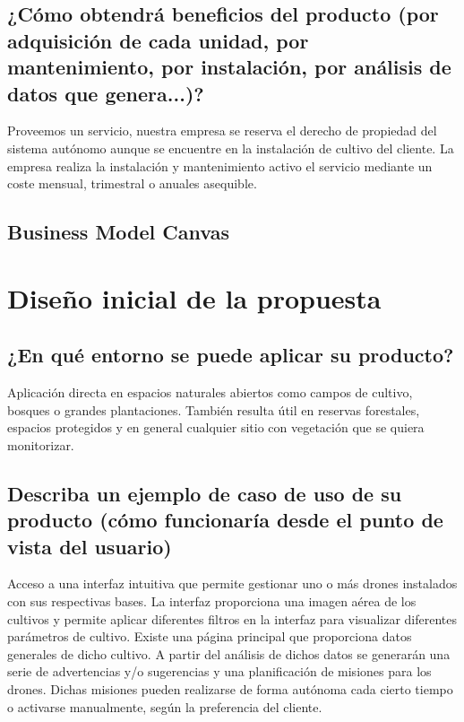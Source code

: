 \documentclass[11pt,spanish]{article} %
\begin{document}
\subsection{¿Cómo obtendrá beneficios del producto (por adquisición de cada unidad, por mantenimiento, por instalación, por análisis de datos que genera...)?}
Proveemos un servicio, nuestra empresa se reserva el derecho de propiedad del sistema autónomo aunque se encuentre en la instalación de cultivo del cliente. La empresa realiza la instalación y mantenimiento activo el servicio mediante un coste mensual, trimestral o anuales asequible.

\subsection{Business Model Canvas}


\newpage

\section{Diseño inicial de la propuesta}

\subsection{¿En qué entorno se puede aplicar su producto?}
Aplicación directa en espacios naturales abiertos como campos de cultivo, bosques o grandes plantaciones. También resulta útil en reservas forestales, espacios protegidos y en general cualquier sitio con vegetación que se quiera monitorizar.


\subsection{Describa un ejemplo de caso de uso de su producto (cómo funcionaría desde el punto de vista del usuario)}

Acceso a una interfaz intuitiva que permite gestionar uno o más drones instalados con sus respectivas bases. La interfaz proporciona una imagen aérea de los cultivos y permite aplicar diferentes filtros en la interfaz para visualizar diferentes parámetros de cultivo. Existe una página principal que proporciona datos generales de dicho cultivo. A partir del análisis de dichos datos se generarán una serie de advertencias y/o sugerencias y una planificación de misiones para los drones. Dichas misiones pueden realizarse de forma autónoma cada cierto tiempo o activarse manualmente, según la preferencia del cliente.
\end{document}
